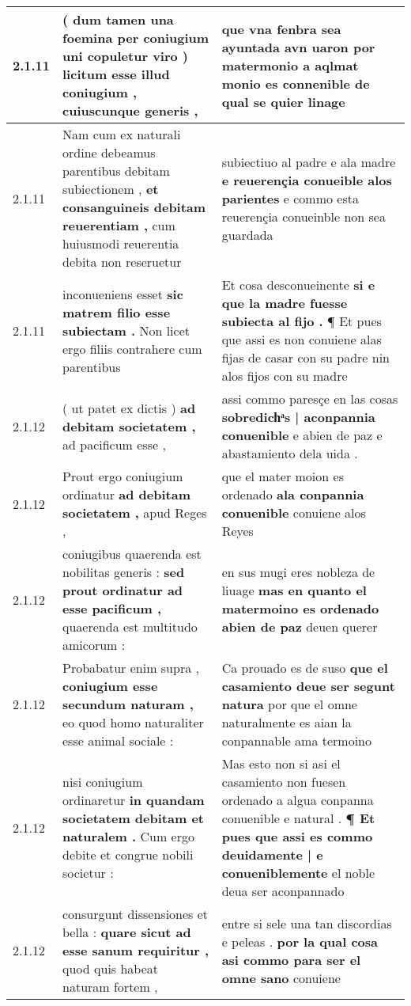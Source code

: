 \begin{tabular}{|p{1cm}|p{6.5cm}|p{6.5cm}|}
2.1.11 & ( dum tamen una foemina per coniugium uni copuletur viro ) \textbf{ licitum esse illud coniugium , } cuiuscunque generis , & que vna fenbra sea ayuntada avn uaron \textbf{ por matermonio a aqlmat monio es connenible } de qual se quier linage \\\hline
2.1.11 & Nam cum ex naturali ordine debeamus parentibus debitam subiectionem , \textbf{ et consanguineis debitam reuerentiam , } cum huiusmodi reuerentia debita non reseruetur & subiectiuo al padre e ala madre \textbf{ e reuerençia conueible alos parientes } e commo esta reuerençia conueinble non sea guardada \\\hline
2.1.11 & inconueniens esset \textbf{ sic matrem filio esse subiectam . } Non licet ergo filiis contrahere cum parentibus & Et cosa desconueinente \textbf{ si e que la madre fuesse subiecta al fijo . } ¶ Et pues que assi es non conuiene alas fijas de casar con su padre nin alos fijos con su madre \\\hline
2.1.12 & ( ut patet ex dictis ) \textbf{ ad debitam societatem , } ad pacificum esse , & assi commo paresçe en las cosas \textbf{ sobredichͣs | aconpannia conuenible } e abien de paz e abastamiento dela uida . \\\hline
2.1.12 & Prout ergo coniugium ordinatur \textbf{ ad debitam societatem , } apud Reges , & que el mater moion es ordenado \textbf{ ala conpannia conuenible } conuiene alos Reyes \\\hline
2.1.12 & coniugibus quaerenda est nobilitas generis : \textbf{ sed prout ordinatur ad esse pacificum , } quaerenda est multitudo amicorum : & en sus mugi eres nobleza de liuage \textbf{ mas en quanto el matermoino es ordenado abien de paz } deuen querer \\\hline
2.1.12 & Probabatur enim supra , \textbf{ coniugium esse secundum naturam , } eo quod homo naturaliter esse animal sociale : & Ca prouado es de suso \textbf{ que el casamiento deue ser segunt natura } por que el omne naturalmente es aian la conpannable ama termoino \\\hline
2.1.12 & nisi coniugium ordinaretur \textbf{ in quandam societatem debitam et naturalem . } Cum ergo debite et congrue nobili societur : & Mas esto non si asi el casamiento non fuesen ordenado a algua conpanna conuenible e natural . \textbf{ ¶ Et pues que assi es commo deuidamente | e conueniblemente } el noble deua ser aconpannado \\\hline
2.1.12 & consurgunt dissensiones et bella : \textbf{ quare sicut ad esse sanum requiritur , } quod quis habeat naturam fortem , & entre si sele una tan discordias e peleas . \textbf{ por la qual cosa asi commo para ser el omne sano } conuiene \\\hline

\end{tabular}
